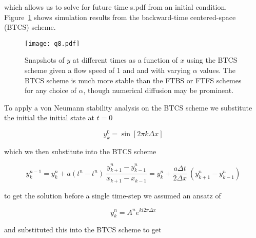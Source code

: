 \documentclass{article}
\begin{document}
\begin{homeworkProblem}
    \noindent which allows us to solve for future time s.pdf from an initial
    condition.\\

    Figure~\ref{fig:p8} shows simulation results from the backward-time
    centered-space (BTCS) scheme. \\
    
    \begin{figure}[!ht]
    \begin{center}
        \texttt{[image: q8.pdf]} 

        \caption{\label{fig:p8} Snapshots of $y$ at different times as a
        function of $x$ using the BTCS scheme given a flow speed of 1 and
        and with varying $\alpha$ values. The BTCS scheme is much more stable
        than the FTBS or FTFS schemes for any choice of $\alpha$, though
        numerical diffusion may be prominent.}

    \end{center}
    \end{figure}
    \clearpage

    To apply a von Neumann stability analysis on the BTCS scheme we substitute
    the initial the initial state at $t = 0$ 

    \begin{equation}
        y_k^0 = \sin[2 \pi k \Delta x]
    \end{equation}

    \noindent which we then substitute into the BTCS scheme

    \begin{equation}
        y^{n-1}_k = y^{n}_k + a(t^{n} - t^n)  \
        \frac{y^{n}_{k+1} - y^{n}_{k-1}}{x_{k+1} - x_{k-1}} =
        y^{n}_k + \frac{a\Delta t}{2 \Delta x}  \
        (y^{n}_{k+1} - y^{n}_{k-1})
    \end{equation}

    \noindent to get the solution before a single time-step we assumed an
    ansatz of 

    \begin{equation}
        y^n_k = A^n e^{ki2\pi\Delta x}
    \end{equation}

    \noindent and substituted this into the BTCS scheme to get


\end{homeworkProblem}
\end{document}
